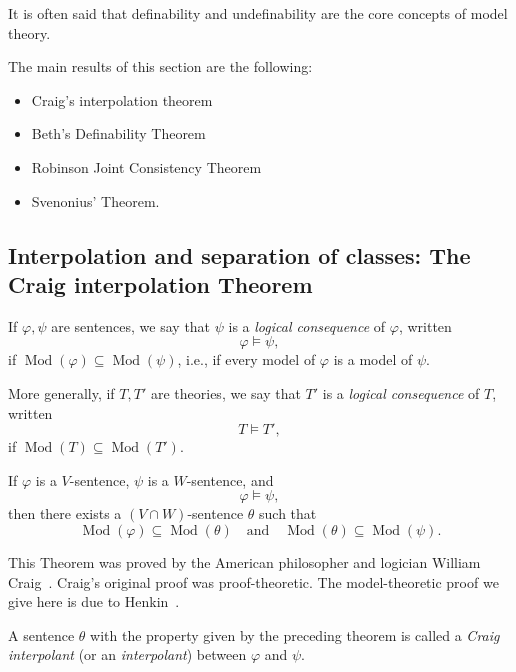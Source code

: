 \documentclass{scrartcl}
\DeclareMathOperator{\Mod}{Mod}
\renewcommand{\phi}{\varphi}
\begin{document}
It is often said that definability and undefinability are the core concepts of model theory.

The main results of this section are the following:

\begin{itemize}
\item 
Craig's interpolation theorem
\item 
Beth's Definability Theorem
\item 
Robinson Joint Consistency Theorem
\item 
Svenonius' Theorem.
\end{itemize}

\subsection{Interpolation and separation of classes: The Craig interpolation Theorem}

\begin{definition}
If $\phi,\psi$ are sentences, we say that $\psi$ is a \emph{logical consequence} of $\phi$, written 
\[
\phi\models\psi,
\]
if $\Mod(\phi)\subseteq \Mod(\psi)$, i.e., if every model of $\phi$ is a model of $\psi$.

More generally,  if $T,T'$ are theories, we say that $T'$ is a \emph{logical consequence} of $T$, written 
\[
T\models T',
\]
if $\Mod(T)\subseteq \Mod(T')$.
\end{definition}

\begin{theorem}
\label{T:Craig interpolation}
If $\phi$ is a $V$-sentence, $\psi$ is a $W$-sentence, and 
\[
\phi\models\psi, 
\]
then there exists a $(V\cap W)$-sentence  $\theta$  such that
\[
\Mod(\phi)\subseteq \Mod(\theta)
\quad\text{and}\quad
\Mod(\theta)\subseteq\Mod(\psi). 
\]
\end{theorem}

\begin{history}
This Theorem was proved by the American philosopher and logician William Craig~\cite{Craig:1957a,Craig:1957b}. Craig's original proof was proof-theoretic. The model-theoretic proof we give here is due to Henkin~\cite{Henkin:1963}.
\end{history}

A sentence $\theta$ with the property given by the preceding theorem is called a \emph{Craig interpolant} (or an \emph{interpolant})  between $\phi$ and $\psi$.
\end{document}

